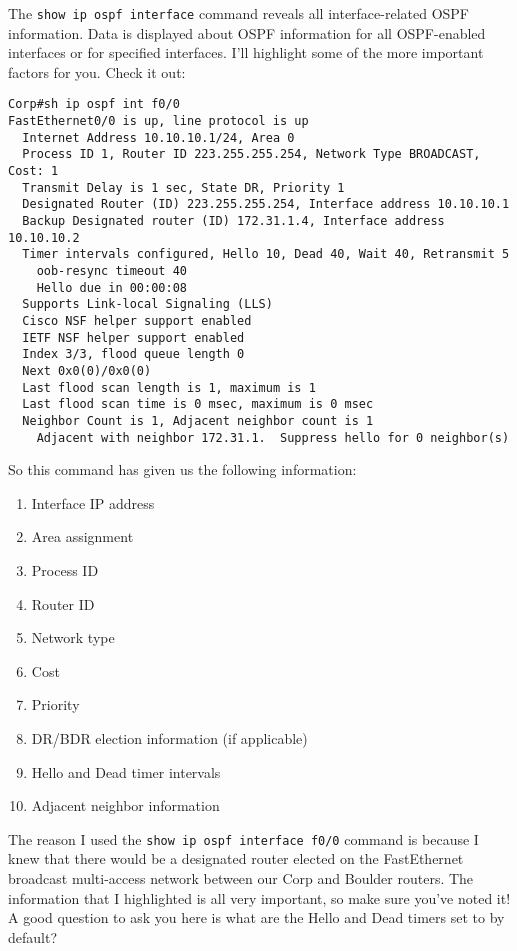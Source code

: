 The \texttt{show\ ip\ ospf\ interface} command reveals all
interface-related OSPF information. Data is displayed about OSPF
information for all OSPF-enabled interfaces or for specified interfaces.
I'll highlight some of the more important factors for you. Check it out:

\begin{verbatim}
Corp#sh ip ospf int f0/0
FastEthernet0/0 is up, line protocol is up
  Internet Address 10.10.10.1/24, Area 0
  Process ID 1, Router ID 223.255.255.254, Network Type BROADCAST, Cost: 1
  Transmit Delay is 1 sec, State DR, Priority 1
  Designated Router (ID) 223.255.255.254, Interface address 10.10.10.1
  Backup Designated router (ID) 172.31.1.4, Interface address 10.10.10.2
  Timer intervals configured, Hello 10, Dead 40, Wait 40, Retransmit 5
    oob-resync timeout 40
    Hello due in 00:00:08
  Supports Link-local Signaling (LLS)
  Cisco NSF helper support enabled
  IETF NSF helper support enabled
  Index 3/3, flood queue length 0
  Next 0x0(0)/0x0(0)
  Last flood scan length is 1, maximum is 1
  Last flood scan time is 0 msec, maximum is 0 msec
  Neighbor Count is 1, Adjacent neighbor count is 1
    Adjacent with neighbor 172.31.1.  Suppress hello for 0 neighbor(s)
\end{verbatim}

So this command has given us the following information:

\begin{enumerate}
\tightlist
\item
  Interface IP address
\item
  Area assignment
\item
  Process ID
\item
  Router ID
\item
  Network type
\item
  Cost
\item
  Priority
\item
  \protect\hypertarget{c18.xhtmlux5cux23Page_769}{}{}DR/BDR election
  information (if applicable)
\item
  Hello and Dead timer intervals
\item
  Adjacent neighbor information
\end{enumerate}

The reason I used the \texttt{show\ ip\ ospf\ interface\ f0/0} command
is because I knew that there would be a designated router elected on the
FastEthernet broadcast multi-access network between our Corp and Boulder
routers. The information that I highlighted is all very important, so
make sure you've noted it! A good question to ask you here is what are
the Hello and Dead timers set to by default?

